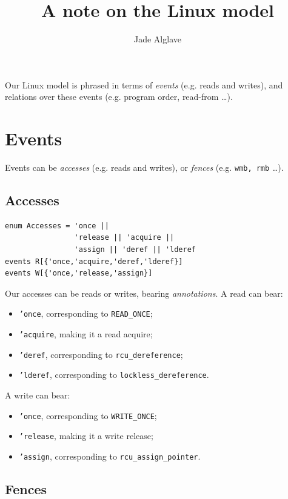 \documentclass[a4paper]{article}
\title{A note on the Linux model}
\date{}
\author{Jade Alglave}
\begin{document}
\maketitle

Our Linux model is phrased in terms of \emph{events} (e.g. reads and writes),
and relations over these events (e.g. program order, read-from \dots).

\section{Events}

Events can be \emph{accesses} (e.g. reads and writes), or \emph{fences} (e.g.
{\tt wmb, rmb} \dots).

\subsection{Accesses}

\begin{verbatim}
enum Accesses = 'once ||
                'release || 'acquire ||
                'assign || 'deref || 'lderef 
events R[{'once,'acquire,'deref,'lderef}]
events W[{'once,'release,'assign}]
\end{verbatim}

Our accesses can be reads or writes, bearing \emph{annotations}. A read can
bear:
\begin{itemize}
\item {\tt 'once}, corresponding to {\tt READ\_ONCE};
\item {\tt 'acquire}, making it a read acquire;
\item {\tt 'deref}, corresponding to {\tt rcu\_dereference};
\item {\tt 'lderef}, corresponding to {\tt lockless\_dereference}.
\end{itemize}

A write can bear:
\begin{itemize}
\item {\tt 'once}, corresponding to {\tt WRITE\_ONCE};
\item {\tt 'release}, making it a write release;
\item {\tt 'assign}, corresponding to {\tt rcu\_assign\_pointer}.
\end{itemize}

\subsection{Fences}
\end{document}
